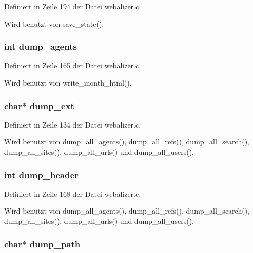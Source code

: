 Definiert in Zeile 194 der Datei webalizer.c.

Wird benutzt von save\_\-state().
\subsubsection{\setlength{\rightskip}{0pt plus 5cm}int {\bf dump\_\-agents}}\label{webalizer_8h_95b4dacf3a1c2e18715bfbd268726afb}




Definiert in Zeile 165 der Datei webalizer.c.

Wird benutzt von write\_\-month\_\-html().
\subsubsection{\setlength{\rightskip}{0pt plus 5cm}char$\ast$ {\bf dump\_\-ext}}\label{webalizer_8h_b11b451e9eab811058070fddc7f42efb}




Definiert in Zeile 134 der Datei webalizer.c.

Wird benutzt von dump\_\-all\_\-agents(), dump\_\-all\_\-refs(), dump\_\-all\_\-search(), dump\_\-all\_\-sites(), dump\_\-all\_\-urls() und dump\_\-all\_\-users().
\subsubsection{\setlength{\rightskip}{0pt plus 5cm}int {\bf dump\_\-header}}\label{webalizer_8h_2a20cc7746e90fec505b066fda4e1f5d}




Definiert in Zeile 168 der Datei webalizer.c.

Wird benutzt von dump\_\-all\_\-agents(), dump\_\-all\_\-refs(), dump\_\-all\_\-search(), dump\_\-all\_\-sites(), dump\_\-all\_\-urls() und dump\_\-all\_\-users().
\subsubsection{\setlength{\rightskip}{0pt plus 5cm}char$\ast$ {\bf dump\_\-path}}\label{webalizer_8h_10b59e622c5a54e43f7ec491e5bc1776}




